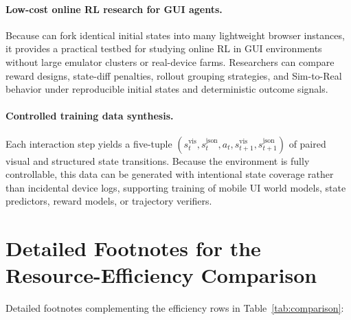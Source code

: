 \paragraph{Low-cost online RL research for GUI agents.} Because \sys{} can fork identical initial states into many lightweight browser instances, it provides a practical testbed for studying online RL in GUI environments without large emulator clusters or real-device farms. Researchers can compare reward designs, state-diff penalties, rollout grouping strategies, and Sim-to-Real behavior under reproducible initial states and deterministic outcome signals.

\paragraph{Controlled training data synthesis.} Each interaction step yields a five-tuple $(s_t^\mathrm{vis}, s_t^\mathrm{json}, a_t, s_{t+1}^\mathrm{vis}, s_{t+1}^\mathrm{json})$ of paired visual and structured state transitions. Because the environment is fully controllable, this data can be generated with intentional state coverage rather than incidental device logs, supporting training of mobile UI world models, state predictors, reward models, or trajectory verifiers.


\section{Detailed Footnotes for the Resource-Efficiency Comparison}\label{app:perf}

Detailed footnotes complementing the efficiency rows in Table~\ref{tab:comparison}:

